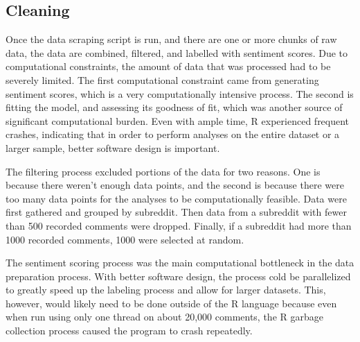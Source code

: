 \documentclass[
]{article}
\begin{document}
\hypertarget{cleaning}{%
\subsection{Cleaning}\label{cleaning}}

Once the data scraping script is run, and there are one or more chunks of raw data, the data are combined, filtered, and labelled with sentiment scores. Due to computational constraints, the amount of data that was processed had to be severely limited. The first computational constraint came from generating sentiment scores, which is a very computationally intensive process. The second is fitting the model, and assessing its goodness of fit, which was another source of significant computational burden. Even with ample time, R experienced frequent crashes, indicating that in order to perform analyses on the entire dataset or a larger sample, better software design is important.

The filtering process excluded portions of the data for two reasons. One is because there weren't enough data points, and the second is because there were too many data points for the analyses to be computationally feasible. Data were first gathered and grouped by subreddit. Then data from a subreddit with fewer than 500 recorded comments were dropped. Finally, if a subreddit had more than 1000 recorded comments, 1000 were selected at random.

The sentiment scoring process was the main computational bottleneck in the data preparation process. With better software design, the process cold be parallelized to greatly speed up the labeling process and allow for larger datasets. This, however, would likely need to be done outside of the R language because even when run using only one thread on about 20,000 comments, the R garbage collection process caused the program to crash repeatedly.
\end{document}
